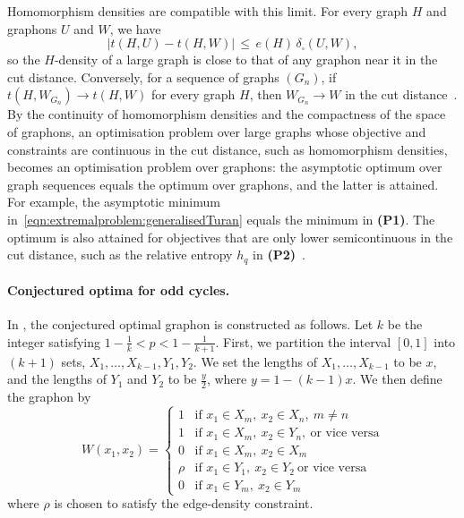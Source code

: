 \documentclass[11pt]{article}
\theoremstyle{plain}
\theoremstyle{definition}
\theoremstyle{remark}
\begin{document}
Homomorphism densities are compatible with this limit. For every graph $H$ and graphons $U$ and $W$, we have
\[
|t(H, U) - t(H, W)| \,\le\, e(H)\, \delta_\square(U, W),
\]
so the $H$-density of a large graph is close to that of any graphon near it in the cut distance. Conversely, for a sequence of graphs $(G_n)$, if $t(H, W_{G_n}) \to t(H, W)$ for every graph $H$, then $W_{G_n} \to W$ in the cut distance~\citep{lovasz2012large}. By the continuity of homomorphism densities and the compactness of the space of graphons, an optimisation problem over large graphs whose objective and constraints are continuous in the cut distance, such as homomorphism densities, becomes an optimisation problem over graphons: the asymptotic optimum over graph sequences equals the optimum over graphons, and the latter is attained. For example, the asymptotic minimum in~\eqref{eqn:extremalproblem:generalisedTuran} equals the minimum in \textbf{(P1)}. The optimum is also attained for objectives that are only lower semicontinuous in the cut distance, such as the relative entropy $h_q$ in \textbf{(P2)}~\citep{chatterjee2011large}.

\paragraph{Conjectured optima for odd cycles.}\label{sec:oddcycleconjecture}
In \citet{bennett2020minimizing}, the conjectured optimal graphon is constructed as follows.
Let $k$ be the integer satisfying $1 - \frac{1}{k} < p < 1-\frac{1}{k+1}$.
First, we partition the interval $[0,1]$ into $(k+1)$ sets, $X_1, \ldots, X_{k-1}, Y_1, Y_2$.
We set the lengths of $X_1,\ldots,X_{k-1}$ to be $x$, and the lengths of $Y_1$ and $Y_2$ to be $\frac{y}{2}$, where $y=1-(k-1)x$.
We then define the graphon by
\[
  W(x_1, x_2) = \begin{cases}
    1 & \text{if } x_1 \in X_m,\ x_2 \in X_n,\ m \neq n
    \\
    1 & \text{if } x_1 \in X_m,\ x_2 \in Y_n,\ \text{or vice versa}
    \\
    0 & \text{if } x_1 \in X_m,\ x_2 \in X_m
    \\
    \rho & \text{if } x_1 \in Y_1,\ x_2 \in Y_2\ \text{or vice versa}
    \\
    0 & \text{if } x_1 \in Y_m,\ x_2 \in Y_m
  \end{cases}
\]
where $\rho$ is chosen to satisfy the edge-density constraint.
\end{document}

